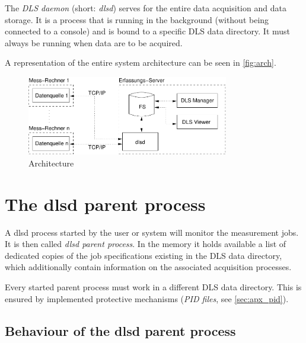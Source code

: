 \documentclass[a4paper,12pt,BCOR6mm,bibtotoc,idxtotoc]{scrbook}
\begin{document}
The \textit{DLS daemon} (short: \textit{dlsd}) serves for the entire data
acquisition and data storage. It is a process that is running in
the background (without being connected to a console) and is bound to a
specific DLS data directory. It must always be
running when data are to be acquired.

A representation of the entire system architecture can be
seen in \autoref{fig:arch}.

\begin{figure}[htb] \begin{center} \includegraphics[width=250pt]{bilder/arch} \end{center} \caption{Architecture} \label{fig:arch} \end{figure}


\section{The dlsd parent process}
\label{sec:dlsd_mother}

A dlsd process started by the user or system will monitor the measurement
jobs. It is then called \textit{dlsd parent process}.
In the memory it holds available a list of dedicated copies of the job
specifications existing in the DLS data directory, which additionally contain
information on the associated acquisition processes.

Every started parent process must work in a different DLS data
directory. This is ensured by implemented protective
mechanisms (\textit{PID files}, see \autoref{sec:apx_pid}).


\subsection{Behaviour of the dlsd parent process}
\label{sec:dlsd_mother_behaviour}
\end{document}

